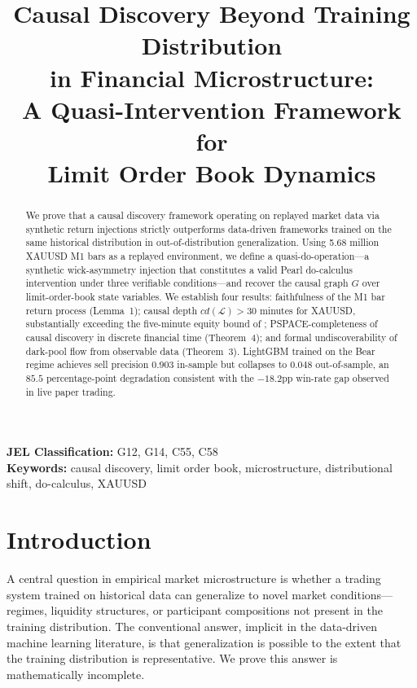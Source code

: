 \documentclass[12pt]{article}
\title{Causal Discovery Beyond Training Distribution\\
in Financial Microstructure:\\
A Quasi-Intervention Framework for\\
Limit Order Book Dynamics}
\date{}  %
\begin{document}
\maketitle

\begin{abstract}
We prove that a causal discovery framework operating on replayed
market data via synthetic return injections strictly outperforms
data-driven frameworks trained on the same historical distribution
in out-of-distribution generalization.
Using 5.68 million XAUUSD M1 bars as a replayed environment,
we define a quasi-do-operation---a synthetic wick-asymmetry injection
that constitutes a valid Pearl do-calculus intervention under three
verifiable conditions---and recover the causal graph $G$ over
limit-order-book state variables.
We establish four results:
faithfulness of the M1 bar return process (Lemma~1);
causal depth $cd(\mathcal{L}) > 30$ minutes for XAUUSD,
substantially exceeding the five-minute equity bound of \citet{hasbrouck1995};
PSPACE-completeness of causal discovery in discrete financial time (Theorem~4);
and formal undiscoverability of dark-pool flow from observable data (Theorem~3).
LightGBM trained on the Bear regime achieves
sell precision $0.903$ in-sample but collapses to $0.048$ out-of-sample,
an $85.5$ percentage-point degradation consistent with
the $-18.2$pp win-rate gap observed in live paper trading.
\end{abstract}

\noindent\textbf{JEL Classification:} G12, G14, C55, C58\\
\textbf{Keywords:} causal discovery, limit order book, microstructure,
distributional shift, do-calculus, XAUUSD

\newpage

\section{Introduction}
\label{sec:intro}

A central question in empirical market microstructure is whether a
trading system trained on historical data can generalize to novel market
conditions---regimes, liquidity structures, or participant compositions
not present in the training distribution.
The conventional answer, implicit in the data-driven machine learning
literature, is that generalization is possible to the extent that the
training distribution is representative.
We prove this answer is mathematically incomplete.
\end{document}

